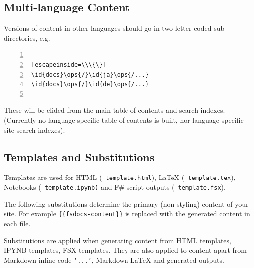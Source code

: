 \documentclass{article}
\newcommand{\id}[1]{\textcolor{black}{#1}}
\newcommand{\ops}[1]{\textcolor{purple}{#1}}
\begin{document}
\subsection*{Multi-language Content}



Versions of content in other languages should go in two-letter coded sub-directories, e.g.
\begin{lstlisting}[numbers=left]

[escapeinside=\\\{\}]
\id{docs}\ops{/}\id{ja}\ops{/...}
\id{docs}\ops{/}\id{de}\ops{/...}


\end{lstlisting}



These will be elided from the main table-of-contents and search indexes.  (Currently no language-specific
table of contents is built, nor language-specific site search indexes).
\subsection*{Templates and Substitutions}



Templates are used for HTML (\texttt{\_template.html}), LaTeX (\texttt{\_template.tex}), Notebooks (\texttt{\_template.ipynb)}
and F\# script outputs (\texttt{\_template.fsx}).


The following substitutions determine the primary (non-styling) content of your site.
For example \texttt{\{\{fsdocs-content\}\}} is replaced with the generated content in each file.


Substitutions are applied when generating content from HTML templates, IPYNB templates, FSX templates.
They are also applied to content apart from Markdown inline code \texttt{`...`}, Markdown LaTeX and
generated outputs.
\end{document}
